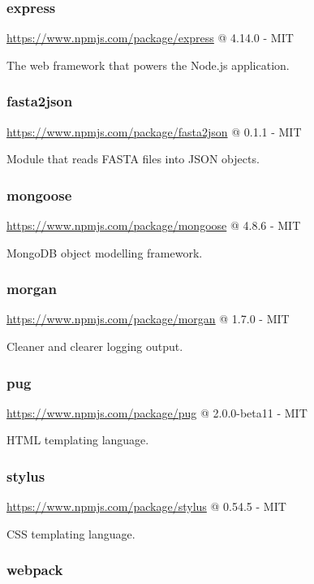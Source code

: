 \subsubsection*{express}

\url{https://www.npmjs.com/package/express} @ 4.14.0 - MIT

The web framework that powers the Node.js application.

\subsubsection*{fasta2json}

\url{https://www.npmjs.com/package/fasta2json} @ 0.1.1 - MIT

Module that reads FASTA files into JSON objects.

\subsubsection*{mongoose}

\url{https://www.npmjs.com/package/mongoose} @ 4.8.6 - MIT

MongoDB object modelling framework.

\subsubsection*{morgan}

\url{https://www.npmjs.com/package/morgan} @ 1.7.0 - MIT

Cleaner and clearer logging output.

\subsubsection*{pug}

\url{https://www.npmjs.com/package/pug} @ 2.0.0-beta11 - MIT

HTML templating language.

\subsubsection*{stylus}

\url{https://www.npmjs.com/package/stylus} @ 0.54.5 - MIT

CSS templating language.

\subsubsection*{webpack}

